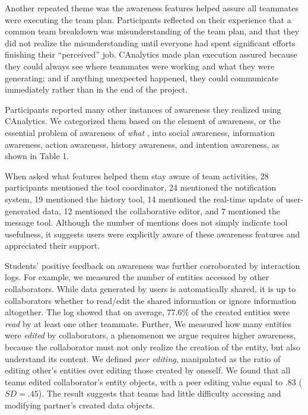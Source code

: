 Another repeated theme was the awareness features helped assure all teammates were executing
the team plan. Participants reflected on their experience that a common
team breakdown was misunderstanding of the team plan, and that they did
not realize the misunderstanding until everyone had spent significant efforts
finishing their ``perceived'' job. CAnalytics made plan execution assured
because they could always see where teammates were working and what they
were generating; and if anything unexpected happened, they could communicate
immediately rather than in the end of the project.

Participants reported many other instances of awareness they realized
using CAnalytics. We categorized them based on the element of awareness,
or the essential problem of awareness of \emph{what}
\cite{Schmidt2002}, into social awareness, information awareness,
action awareness, history awareness, and intention awareness, as shown
in Table 1.

When asked what features helped them stay aware of team activities, 28
participants mentioned the tool coordinator, 24 mentioned the
notification system, 19 mentioned the history tool, 14 mentioned the
real-time update of user-generated data, 12 mentioned the collaborative
editor, and 7 mentioned the message tool. Although the number of mentions
does not simply indicate tool usefulness, it suggests users were explicitly aware of these awareness features and appreciated their support.

Students' positive feedback on awareness was further corroborated by
interaction logs. For example, we measured the number of entities
accessed by other collaborators. While data
generated by users is automatically shared, it is up to collaborators
whether to read/edit the shared information or ignore information altogether.
The log showed that on average, 77.6\% of the created entities
were \emph{read} by at least one other teammate. Further, We measured how
many entities were \emph{edited} by collaborators, a phenomenon we argue
requires higher awareness, because the collaborator must not only realize
the creation of the entity, but also understand its content. We
defined \emph{peer editing}, manipulated as the ratio of editing other's
entities over editing those created by oneself. We found that all teams
edited collaborator's entity objects, with a peer editing value equal
to .83 ($SD=.45$). The result suggests that teams had little difficulty
accessing and modifying partner's created data objects.

